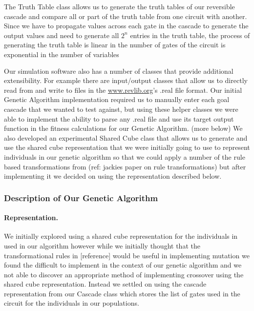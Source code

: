 The Truth Table class allows us to generate the truth tables of our reversible cascade and compare all or part of the truth 
table from one circuit with another. Since we have to propagate values across each gate in the cascade to generate the output 
values and need to generate all \(2^{n}\) entries in the truth table, the process of generating the truth table is linear in the 
number of gates of the circuit is exponential in the number of variables 

Our simulation software also has a number of classes that provide additional extensibility. For example there are input/output 
classes that allow us to directly read from and write to files in the \url{www.revlib.org}'s .real file format. Our initial Genetic Algorithm implementation 
required us to manually enter each goal cascade that we wanted to test against, but using these helper classes we were able to 
implement the ability to parse any .real file and use its target output function in the fitness calculations for our Genetic 
Algorithm. (more below) We also developed an experimental Shared Cube class that allows us to generate and use the shared cube 
representation that we were initially going to use to represent individuals in our genetic algorithm so that we could apply a 
number of the rule based transformations from (ref: jackies paper on rule transformations) but after implementing it we decided 
on using the representation described below. 

  \subsubsection{Description of Our Genetic Algorithm}

\paragraph{Representation.} 

We initially explored using a shared cube representation for the individuals in used in our algorithm however while we initially 
thought that the transformational rules  in [reference] would be useful in implementing mutation we found the difficult to implement 
in the context of our genetic algorithm and we not able to discover an appropriate method of implementing crossover using the shared 
cube representation. Instead we settled on using the cascade representation from our Cascade class which stores the list of gates used 
in the circuit for the individuals in our populations.

